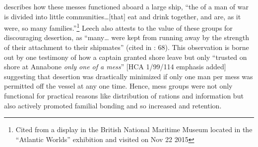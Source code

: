 describes how these messes functioned aboard a large ship, “the  of a man of war is divided into little communities…[that] eat and drink together, and are, as it were, so many families.”\footnote{Cited from a display in the British National Maritime Museum located in the “Atlantic Worlds” exhibition and visited on Nov 22 2015} Leech also attests to the value of these groups for discouraging desertion, as “many… were kept from running away by the strength of their attachment to their shipmates” (cited in \citealt{AdkinsAdkins2008}: 68). This observation is borne out by one testimony of how a captain granted shore leave but only “trusted on shore at Annabone \textit{only one of a mess}” [HCA 1/99/114 emphasis added] suggesting that desertion was drastically minimized if only one man per mess was permitted off the vessel at any one time. Hence, mess groups were not only functional for practical reasons like distribution of rations and information but also actively promoted familial bonding and so increased  and  retention.  

